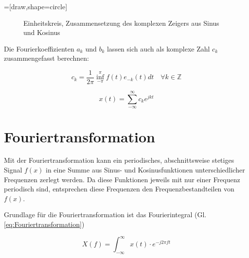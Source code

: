 =[draw,shape=circle]
\begin{figure}[ht]
\centering
{}
\caption{Einheitskreis, Zusammensetzung des komplexen Zeigers aus Sinus und Kosinus}
\label{pic:Einheitskreis}
\end{figure}


Die Fourierkoeffizienten $a_k$ und $b_k$ lassen sich auch als komplexe Zahl $c_k$ zusammengefasst berechnen:

\begin{equation}
 c_k = \frac{1}{2\pi} \inf_{-\pi}^{\pi} f(t) e_{-k}(t) dt \quad \forall k \in \mathbb{Z}
\end{equation}



\begin{equation}
 x(t) = \sum_{-\infty}^{\infty} c_k e^{jkt}
\end{equation}


\section{Fouriertransformation}
Mit der Fouriertransformation kann ein periodisches, abschnittsweise stetiges Signal $f(x)$ in eine Summe aus Sinus- und
Kosinusfunktionen unterschiedlicher Frequenzen zerlegt werden. Da diese Funktionen jeweils mit nur einer Frequenz periodisch sind, entsprechen diese
Frequenzen den Frequenzbestandteilen von $f(x)$. 

Grundlage für die Fouriertransformation ist das Fourierintegral (Gl. \ref{eq:Fouriertransformation})

\begin{equation}\label{eq:Fouriertransformation}
 X(f) = \int^{\infty}_{-\infty} x(t) \cdot e^{-j 2 \pi f t}
\end{equation}

